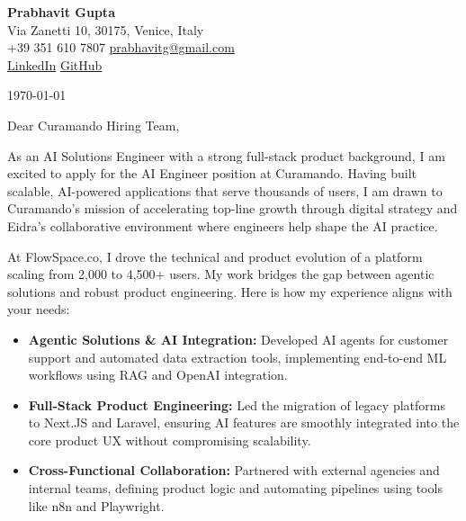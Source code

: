 \documentclass[11pt,a4paper]{article}
\begin{document}
\begin{center}
    {\huge \textbf{Prabhavit Gupta}} \\
    \vspace{4pt}
    Via Zanetti 10, 30175, Venice, Italy \\
    +39 351 610 7807 \textbar{} \href{mailto:prabhavitg@gmail.com}{prabhavitg@gmail.com} \\
    \href{https://www.linkedin.com/in/prabhavit/}{LinkedIn} \textbar{} \href{https://github.com/prab-gupta}{GitHub}
\end{center}

\vspace{20pt}

\noindent \today

\vspace{10pt}

\noindent Dear Curamando Hiring Team,

\vspace{10pt}

\noindent As an AI Solutions Engineer with a strong full-stack product background, I am excited to apply for the AI Engineer position at Curamando. Having built scalable, AI-powered applications that serve thousands of users, I am drawn to Curamando's mission of accelerating top-line growth through digital strategy and Eidra's collaborative environment where engineers help shape the AI practice.

\noindent At FlowSpace.co, I drove the technical and product evolution of a platform scaling from 2,000 to 4,500+ users. My work bridges the gap between agentic solutions and robust product engineering. Here is how my experience aligns with your needs:

\begin{itemize}[leftmargin=*]
    \item \textbf{Agentic Solutions \& AI Integration:} Developed AI agents for customer support and automated data extraction tools, implementing end-to-end ML workflows using RAG and OpenAI integration.
    \item \textbf{Full-Stack Product Engineering:} Led the migration of legacy platforms to Next.JS and Laravel, ensuring AI features are smoothly integrated into the core product UX without compromising scalability.
    \item \textbf{Cross-Functional Collaboration:} Partnered with external agencies and internal teams, defining product logic and automating pipelines using tools like n8n and Playwright.
\end{itemize}
\end{document}
